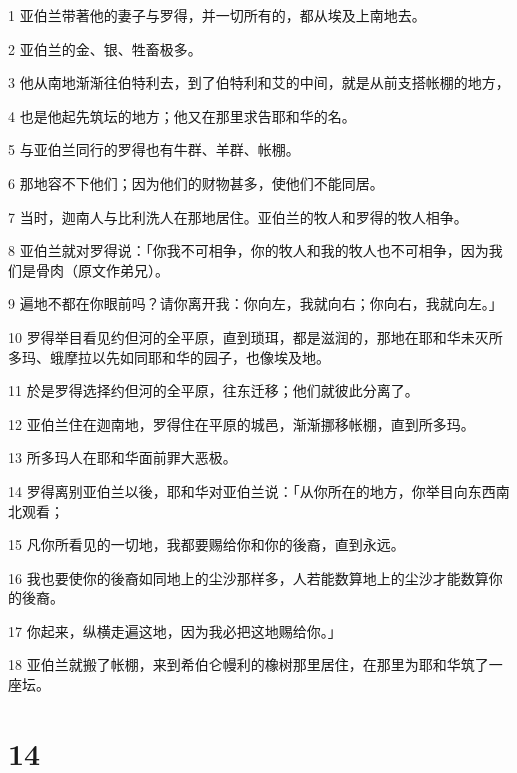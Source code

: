 \par 1 亚伯兰带著他的妻子与罗得，并一切所有的，都从埃及上南地去。
\par 2 亚伯兰的金、银、牲畜极多。
\par 3 他从南地渐渐往伯特利去，到了伯特利和艾的中间，就是从前支搭帐棚的地方，
\par 4 也是他起先筑坛的地方；他又在那里求告耶和华的名。
\par 5 与亚伯兰同行的罗得也有牛群、羊群、帐棚。
\par 6 那地容不下他们；因为他们的财物甚多，使他们不能同居。
\par 7 当时，迦南人与比利洗人在那地居住。亚伯兰的牧人和罗得的牧人相争。
\par 8 亚伯兰就对罗得说：「你我不可相争，你的牧人和我的牧人也不可相争，因为我们是骨肉（原文作弟兄）。
\par 9 遍地不都在你眼前吗？请你离开我：你向左，我就向右；你向右，我就向左。」
\par 10 罗得举目看见约但河的全平原，直到琐珥，都是滋润的，那地在耶和华未灭所多玛、蛾摩拉以先如同耶和华的园子，也像埃及地。
\par 11 於是罗得选择约但河的全平原，往东迁移；他们就彼此分离了。
\par 12 亚伯兰住在迦南地，罗得住在平原的城邑，渐渐挪移帐棚，直到所多玛。
\par 13 所多玛人在耶和华面前罪大恶极。
\par 14 罗得离别亚伯兰以後，耶和华对亚伯兰说：「从你所在的地方，你举目向东西南北观看；
\par 15 凡你所看见的一切地，我都要赐给你和你的後裔，直到永远。
\par 16 我也要使你的後裔如同地上的尘沙那样多，人若能数算地上的尘沙才能数算你的後裔。
\par 17 你起来，纵横走遍这地，因为我必把这地赐给你。」
\par 18 亚伯兰就搬了帐棚，来到希伯仑幔利的橡树那里居住，在那里为耶和华筑了一座坛。

\chapter{14}


